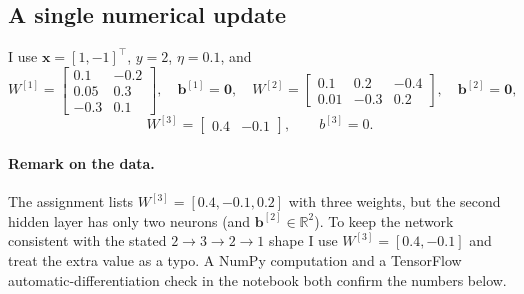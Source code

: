 \documentclass[11pt,a4paper]{article}
\begin{document}
\subsection{A single numerical update}
I use $\mathbf{x}=[1,-1]^\top$, $y=2$, $\eta=0.1$, and
\[
W^{[1]}=\begin{bmatrix}0.1&-0.2\\0.05&0.3\\-0.3&0.1\end{bmatrix},\quad
\mathbf{b}^{[1]}=\mathbf{0},\quad
W^{[2]}=\begin{bmatrix}0.1&0.2&-0.4\\0.01&-0.3&0.2\end{bmatrix},\quad
\mathbf{b}^{[2]}=\mathbf{0},
\]
\[
W^{[3]}=\begin{bmatrix}0.4&-0.1\end{bmatrix},\qquad b^{[3]}=0.
\]

\paragraph{Remark on the data.} The assignment lists $W^{[3]}=[0.4,-0.1,0.2]$ with three
weights, but the second hidden layer has only two neurons (and $\mathbf{b}^{[2]}\in
\mathbb{R}^2$). To keep the network consistent with the stated $2\to3\to2\to1$ shape I use
$W^{[3]}=[0.4,-0.1]$ and treat the extra value as a typo. A NumPy computation and a
TensorFlow automatic-differentiation check in the notebook both confirm the numbers below.
\end{document}
